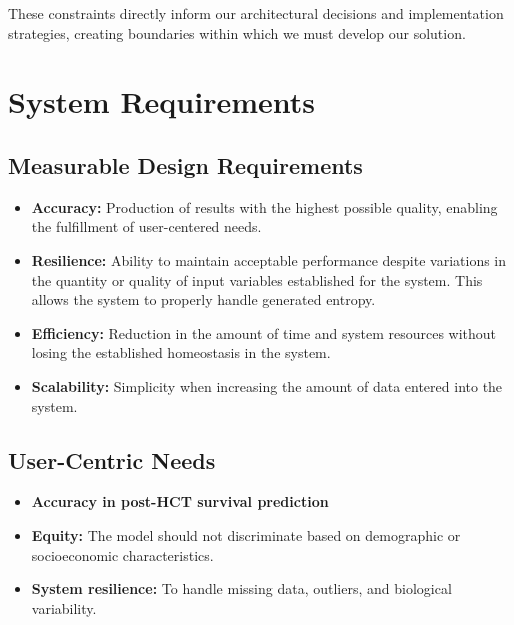 These constraints directly inform our architectural decisions and implementation strategies, creating boundaries within which we must develop our solution.

\section{System Requirements}

\subsection{Measurable Design Requirements}

\begin{itemize}
    \item \textbf{Accuracy:} Production of results with the highest possible quality, enabling the fulfillment of user-centered needs.
    
    \item \textbf{Resilience:} Ability to maintain acceptable performance despite variations in the quantity or quality of input variables established for the system. This allows the system to properly handle generated entropy.
    
    \item \textbf{Efficiency:} Reduction in the amount of time and system resources without losing the established homeostasis in the system.
    
    \item \textbf{Scalability:} Simplicity when increasing the amount of data entered into the system.
\end{itemize}

\subsection{User-Centric Needs}

\begin{itemize}
    \item \textbf{Accuracy in post-HCT survival prediction}
    
    \item \textbf{Equity:} The model should not discriminate based on demographic or socioeconomic characteristics.
    
    \item \textbf{System resilience:} To handle missing data, outliers, and biological variability.
\end{itemize}

